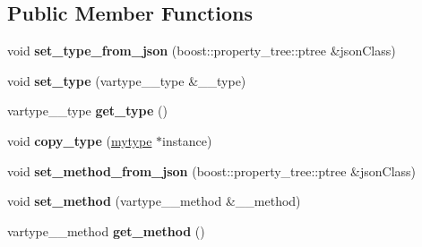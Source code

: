\subsection*{Public Member Functions}
\begin{DoxyCompactItemize}
\item 
\mbox{\label{classfilter_1_1algos_1_1_binary_adaptive_a7f3d6541fbdb9692fd414159355abd2a}} 
void {\bfseries set\+\_\+type\+\_\+from\+\_\+json} (boost\+::property\+\_\+tree\+::ptree \&json\+Class)
\item 
\mbox{\label{classfilter_1_1algos_1_1_binary_adaptive_a87bd21febf5b3a8ad4ad47cfc33a5b37}} 
void {\bfseries set\+\_\+type} (vartype\+\_\+\+\_\+type \&\+\_\+\+\_\+type)
\item 
\mbox{\label{classfilter_1_1algos_1_1_binary_adaptive_ac4c63a470a9562c1a3b15bcbff3aab73}} 
vartype\+\_\+\+\_\+type {\bfseries get\+\_\+type} ()
\item 
\mbox{\label{classfilter_1_1algos_1_1_binary_adaptive_a1d8ee180da87f5223a419cd06b261c5e}} 
void {\bfseries copy\+\_\+type} (\hyperlink{classfilter_1_1algos_1_1_binary_adaptive}{mytype} $\ast$instance)
\item 
\mbox{\label{classfilter_1_1algos_1_1_binary_adaptive_aaf708f9c26f801d9328b2c6eab8a8eac}} 
void {\bfseries set\+\_\+method\+\_\+from\+\_\+json} (boost\+::property\+\_\+tree\+::ptree \&json\+Class)
\item 
\mbox{\label{classfilter_1_1algos_1_1_binary_adaptive_aaf2c08ccd0d4fb73cf25fe75bfda5563}} 
void {\bfseries set\+\_\+method} (vartype\+\_\+\+\_\+method \&\+\_\+\+\_\+method)
\item 
\mbox{\label{classfilter_1_1algos_1_1_binary_adaptive_a8bcee7536f8977938c19556eaac5c994}} 
vartype\+\_\+\+\_\+method {\bfseries get\+\_\+method} ()
\item 
\mbox{\label{classfilter_1_1algos_1_1_binary_adaptive_a944fee61b03bec23221203f3280b89bf}} 

\end{DoxyCompactItemize}
